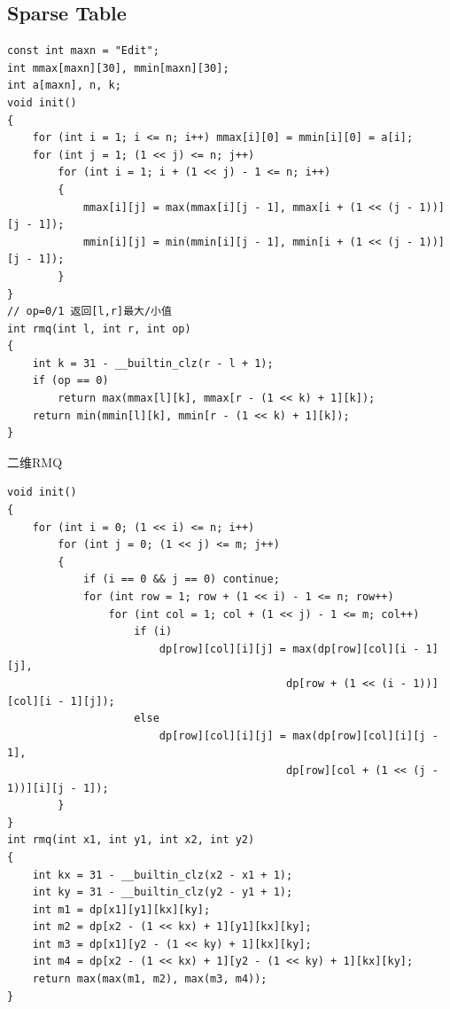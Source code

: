 \documentclass[twoside]{article}
\begin{document}
\subsection{Sparse Table}
\begin{lstlisting}
const int maxn = "Edit";
int mmax[maxn][30], mmin[maxn][30];
int a[maxn], n, k;
void init()
{
    for (int i = 1; i <= n; i++) mmax[i][0] = mmin[i][0] = a[i];
    for (int j = 1; (1 << j) <= n; j++)
        for (int i = 1; i + (1 << j) - 1 <= n; i++)
        {
            mmax[i][j] = max(mmax[i][j - 1], mmax[i + (1 << (j - 1))][j - 1]);
            mmin[i][j] = min(mmin[i][j - 1], mmin[i + (1 << (j - 1))][j - 1]);
        }
}
// op=0/1 返回[l,r]最大/小值
int rmq(int l, int r, int op)
{
    int k = 31 - __builtin_clz(r - l + 1);
    if (op == 0)
        return max(mmax[l][k], mmax[r - (1 << k) + 1][k]);
    return min(mmin[l][k], mmin[r - (1 << k) + 1][k]);
}
\end{lstlisting}
二维RMQ
\begin{lstlisting}
void init()
{
    for (int i = 0; (1 << i) <= n; i++)
        for (int j = 0; (1 << j) <= m; j++)
        {
            if (i == 0 && j == 0) continue;
            for (int row = 1; row + (1 << i) - 1 <= n; row++)
                for (int col = 1; col + (1 << j) - 1 <= m; col++)
                    if (i)
                        dp[row][col][i][j] = max(dp[row][col][i - 1][j],
                                            dp[row + (1 << (i - 1))][col][i - 1][j]);
                    else
                        dp[row][col][i][j] = max(dp[row][col][i][j - 1],
                                            dp[row][col + (1 << (j - 1))][i][j - 1]);
        }
}
int rmq(int x1, int y1, int x2, int y2)
{
    int kx = 31 - __builtin_clz(x2 - x1 + 1);
    int ky = 31 - __builtin_clz(y2 - y1 + 1);
    int m1 = dp[x1][y1][kx][ky];
    int m2 = dp[x2 - (1 << kx) + 1][y1][kx][ky];
    int m3 = dp[x1][y2 - (1 << ky) + 1][kx][ky];
    int m4 = dp[x2 - (1 << kx) + 1][y2 - (1 << ky) + 1][kx][ky];
    return max(max(m1, m2), max(m3, m4));
}
\end{lstlisting}
\end{document}
